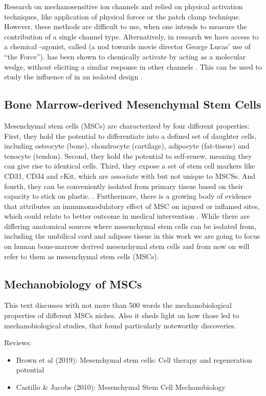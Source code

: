 Research on mechanosensitive ion channels and \Piezo{} relied on physical activation techniques, like application of physical forces or the patch clamp technique. However, these methods are difficult to use, when one intends to measure the contribution of a single channel type. \cite{Dubin2017} Alternatively, in research we have access to a chemical \Piezo{}-agonist, called \Yoda{} (a nod towards movie director George Lucas’ use of “the Force”). \Yoda{} has been shown to chemically activate \Piezo{} by acting as a molecular wedge, without eliciting a similar response in other channels \cite{Syeda2015, Lacroix2018}. This can be used to study the influence of \Piezo{} in an isolated design \cite{Botello-Smith2019}.

\subsection{Bone Marrow-derived Mesenchymal Stem Cells}

Mesenchymal stem cells (MSCs) are characterized by four different properties: First, they hold the potential to differentiate into a defined set of daughter cells, including osteocyte (bone), chondrocyte (cartilage), adipocyte (fat-tissue) and tenocyte (tendon).\cite{Ng2008} Second, they hold the potential to self-renew, meaning they can give rise to identical cells. Third, they expose a set of stem cell markers like CD31, CD34 and cKit, which are associate with but not unique to MSCSs. \cite{Battula2009} And fourth, they can be conveniently isolated from primary tissue based on their capacity to stick on plastic. \cite{Buhring2007}. Furthermore, there is a growing body of evidence that attributes an immunomodulatory effect of MSC on injured or inflamed sites, which could relate to better outcome in medical intervention \cite{Caplan2011, Hass2011}.
While there are differing anatomical sources where mesenchymal stem cells can be isolated from, including the umbilical cord and adipose tissue \cite{Barlow2008, Hass2011} in this work we are going to focus on human bone-marrow derived mesenchymal stem cells and from now on will refer to them as mesenchymal stem cells (MSCs).

\subsection{Mechanobiology of MSCs}

This text discusses with not more than 500 words the mechanobiological properties of different MSCs niches. Also it sheds light on how those led to mechanobiological studies, that found particularly noteworthy discoveries. \par

Reviews:
\begin{itemize}
	\item Brown et al (2019): Mesenchymal stem cells: Cell therapy and regeneration potential
	\item Castillo \& Jacobs (2010): Mesenchymal Stem Cell Mechanobiology
\end{itemize}


